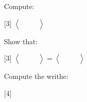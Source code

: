 \documentclass[14pt]{extarticle}
\newcommand{\LA}{\left\langle}
\newcommand{\RA}{\right\rangle}
\newcommand{\img}[1]{\begin{aligned}
    &\quad\\
    &\\
    &\quad
\end{aligned}}
\newcommand{\bkt}[1]{\LA\img{#1}\RA}
\begin{document}
\fancyhead{}

Compute:
\vspace{-5cm}
\begin{center}
    \scalebox{3}[3]{
        $\bkt{trefoil_a.svg}$
        }
\end{center}

\newpage

Show that:
\vspace{-4cm}
\begin{center}
    \scalebox{3}[3]{
        $\bkt{1.svg}=\bkt{6.svg}$
        }
    \end{center}

\vspace{4in}

Compute the writhe:
\vspace{-6cm}
\begin{center}
    \scalebox{4}[4]{
        $\img{trefoil.svg}$
        }
\end{center}
\end{document}
